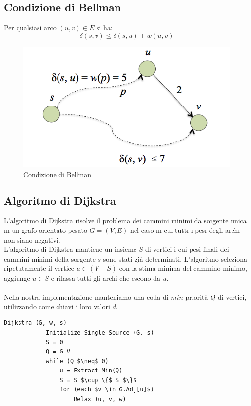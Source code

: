 \subsection{Condizione di Bellman}
Per qualsiasi arco $(u,v) \in E$ si ha:
    \begin{equation}
        \delta(s, v) \leq \delta(s, u) + w (u, v)
    \end{equation}
    \begin{figure}[h!]
        \centering
        \includegraphics[scale = 0.7]{img02.png}
        \caption{Condizione di Bellman}
    \end{figure}
    
    
\subsection{Algoritmo di Dijkstra}
L'algoritmo di Dijkstra risolve il problema dei cammini minimi da sorgente unica in un grafo orientato pesato $G = (V, E)$ nel caso in cui tutti i pesi degli archi non siano negativi.\\
L'algoritmo di Dijkstra mantiene un insieme $S$ di vertici i cui pesi finali dei cammini minimi della sorgente $s$ sono stati già determinati. L'algoritmo seleziona ripetutamente il vertice $u \in (V-S)$ con la stima minima del cammino minimo, aggiunge $u \in S$ e rilassa tutti gli archi che escono da $u$.\\\\
Nella nostra implementazione manteniamo una coda di $min$-priorità $Q$ di vertici, utilizzando come chiavi i loro valori $d$.
    \begin{lstlisting}[caption = Algoritmo di Dijkstra]
        Dijkstra (G, w, s)
            Initialize-Single-Source (G, s)
            S = 0
            Q = G.V
            while (Q $\neq$ 0)
                u = Extract-Min(Q)
                S = S $\cup \{$ S $\}$
                for (each $v \in G.Adj[u]$)
                    Relax (u, v, w)
    \end{lstlisting}
